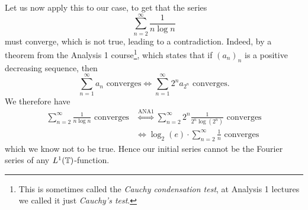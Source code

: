 \documentclass[a4paper, 12pt]{article}
\begin{document}
\begin{Exercise}
    Let us now apply this to our case, to get that the series
    \[
        \sum_{n = 2}^{\infty} \frac{1}{n \log n}
    \]
    must converge, which is not true, leading to a contradiction.  Indeed, by a
    theorem from the Analysis 1 course\footnote{This is sometimes called the
    \emph{Cauchy condensation test}, at Analysis 1 lectures we called it just
    \emph{Cauchy's test}.}, which states that if $(a_n)_n$ is a positive
    decreasing sequence, then
    \[
        \sum_{n=1}^{\infty} a_n \text{ converges}
        \iff \sum_{n = 1}^{\infty} 2^n a_{2^n} \text{ converges}.
    \]
    We therefore have
    \begin{align*}
        \sum_{n = 2}^{\infty}\frac{1}{n \log n} \text{ converges}
        &\overset{\text{ANA1}}{\iff} \sum_{n = 2}^{\infty} 2^n \frac{1}{2^n \log(2^n)} \text{ converges} \\
        &\iff \log_2(e) \cdot \sum_{n = 2}^{\infty} \frac{1}{n} \text{ converges}
    \end{align*}
    which we know not to be true.
    Hence our initial series cannot be the Fourier series of any $L^1(\mathbb{T})$-function.
\end{Exercise}

\end{document}

